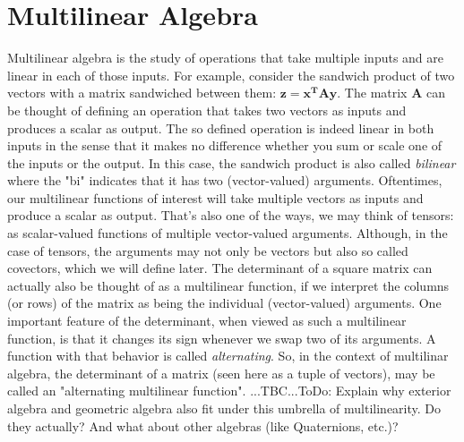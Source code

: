 \chapter{Multilinear Algebra}
Multilinear algebra is the study of operations that take multiple inputs and are linear in each of those inputs. For example, consider the sandwich product of two vectors with a matrix sandwiched between them: $\mathbf{z = x^T A y}$. The matrix $\mathbf{A}$ can be thought of defining an operation that takes two vectors as inputs and produces a scalar as output. The so defined operation is indeed linear in both inputs in the sense that it makes no difference whether you sum or scale one of the inputs or the output. In this case, the sandwich product is also called \emph{bilinear} where the "bi" indicates that it has two (vector-valued) arguments. Oftentimes, our multilinear functions of interest will take multiple vectors as inputs and produce a scalar as output. That's also one of the ways, we may think of tensors: as scalar-valued functions of multiple vector-valued arguments. Although, in the case of tensors, the arguments may not only be vectors but also so called covectors, which we will define later. The determinant of a square matrix can actually also be thought of as a multilinear function, if we interpret the columns (or rows) of the matrix as being the individual (vector-valued) arguments. One important feature of the determinant, when viewed as such a multilinear function, is that it changes its sign whenever we swap two of its arguments. A function with that behavior is called \emph{alternating}. So, in the context of multilinar algebra, the determinant of a matrix (seen here as a tuple of vectors), may be called an "alternating multilinear function". ...TBC...ToDo: Explain why exterior algebra and geometric algebra also fit under this umbrella of multilinearity. Do they actually? And what about other algebras (like Quaternions, etc.)?

